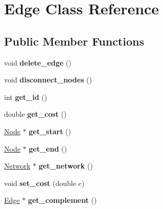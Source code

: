 \hypertarget{classEdge}{}\section{Edge Class Reference}
\label{classEdge}
\subsection*{Public Member Functions}
\begin{DoxyCompactItemize}
\item 
\hypertarget{classEdge_ac26d126cbd26713041dba5e28ea509b4}{}void {\bfseries delete\+\_\+edge} ()\label{classEdge_ac26d126cbd26713041dba5e28ea509b4}

\item 
\hypertarget{classEdge_ac544315709bb6180fbf626b7f0824fb5}{}void {\bfseries disconnect\+\_\+nodes} ()\label{classEdge_ac544315709bb6180fbf626b7f0824fb5}

\item 
\hypertarget{classEdge_a41de688b688ed7b033c683d0edd70d6f}{}int {\bfseries get\+\_\+id} ()\label{classEdge_a41de688b688ed7b033c683d0edd70d6f}

\item 
\hypertarget{classEdge_a3b40969f1821c69ca88bcbe190d77fa8}{}double {\bfseries get\+\_\+cost} ()\label{classEdge_a3b40969f1821c69ca88bcbe190d77fa8}

\item 
\hypertarget{classEdge_a21c32209277b91c97adc0b7bf73fdfa2}{}\hyperlink{classNode}{Node} $\ast$ {\bfseries get\+\_\+start} ()\label{classEdge_a21c32209277b91c97adc0b7bf73fdfa2}

\item 
\hypertarget{classEdge_a14b1b17cd5e63bc9986ddcd0318815f3}{}\hyperlink{classNode}{Node} $\ast$ {\bfseries get\+\_\+end} ()\label{classEdge_a14b1b17cd5e63bc9986ddcd0318815f3}

\item 
\hypertarget{classEdge_ad0d741fb5da9a6057f938a2d2cef7e8a}{}\hyperlink{classNetwork}{Network} $\ast$ {\bfseries get\+\_\+network} ()\label{classEdge_ad0d741fb5da9a6057f938a2d2cef7e8a}

\item 
\hypertarget{classEdge_af69eeda73987ab72d483cd95ad830cde}{}void {\bfseries set\+\_\+cost} (double c)\label{classEdge_af69eeda73987ab72d483cd95ad830cde}

\item 
\hypertarget{classEdge_aee63d265ded0609b41a3d5b84756c1ac}{}\hyperlink{classEdge}{Edge} $\ast$ {\bfseries get\+\_\+complement} ()\label{classEdge_aee63d265ded0609b41a3d5b84756c1ac}


\end{DoxyCompactItemize}
